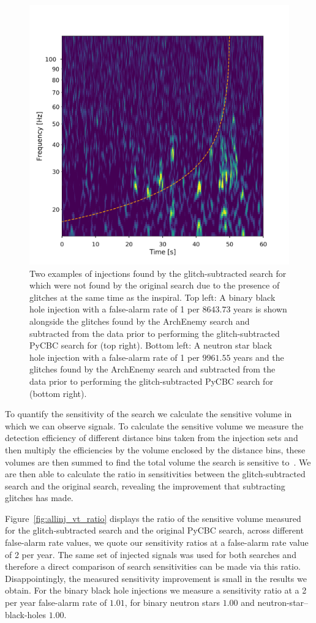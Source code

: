 \begin{figure}
\begin{minipage}[t]{1.0\linewidth}
    \includegraphics[width=0.49\linewidth]{images/archenemy/Section4/4.1/NSBH_H1_loud_Subtracted.pdf}
  \end{minipage}
    \caption{Two examples of \gw{} injections found by the glitch-subtracted search for \gws{} which were not found by the original \gw{} search due to the presence of \scl{} glitches at the same time as the \gw{} inspiral. Top left: A binary black hole injection with a false-alarm rate of 1 per $8643.73$ years is shown alongside the \scl{} glitches found by the ArchEnemy search and subtracted from the data prior to performing the glitch-subtracted PyCBC search for \gws{} (top right). Bottom left: A neutron star black hole injection with a false-alarm rate of 1 per $9961.55$ years and the \scl{} glitches found by the ArchEnemy search and subtracted from the data prior to performing the glitch-subtracted PyCBC search for \gws{} (bottom right).}
    \label{fig:ae_found}
\end{figure}

To quantify the sensitivity of the search we calculate the sensitive volume in which we can observe \gw{} signals. To calculate the sensitive volume we measure the detection efficiency of different distance bins taken from the injection sets and then multiply the efficiencies by the volume enclosed by the distance bins, these volumes are then summed to find the total volume the search is sensitive to~\cite{rw_snr_eq}. We are then able to calculate the ratio in sensitivities between the glitch-subtracted \gw{} search and the original \gw{} search,  revealing the improvement that subtracting \scl{} glitches has made.

Figure~\ref{fig:allinj_vt_ratio} displays the ratio of the sensitive volume measured for the glitch-subtracted \gw{} search and the original PyCBC \gw{} search, across different false-alarm rate values, we quote our sensitivity ratios at a false-alarm rate value of 2 per year. The same set of injected signals was used for both \gw{} searches and therefore a direct comparison of search sensitivities can be made via this ratio. Disappointingly, the measured sensitivity improvement is small in the results we obtain. For the binary black hole injections we measure a sensitivity ratio at a 2 per year false-alarm rate of $1.01$, for binary neutron stars $1.00$ and neutron-star--black-holes $1.00$. 

